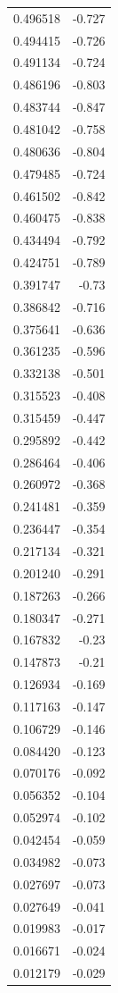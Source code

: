 \documentclass[number, sort&compress, review, 12pt]{elsarticle}
\begin{document}
\begin{longtable}{rr}
0.496518 & -0.727\\
0.494415 & -0.726\\
0.491134 & -0.724\\
0.486196 & -0.803\\
0.483744 & -0.847\\
0.481042 & -0.758\\
0.480636 & -0.804\\
0.479485 & -0.724\\
0.461502 & -0.842\\
0.460475 & -0.838\\
0.434494 & -0.792\\
0.424751 & -0.789\\
0.391747 & -0.73\\
0.386842 & -0.716\\
0.375641 & -0.636\\
0.361235 & -0.596\\
0.332138 & -0.501\\
0.315523 & -0.408\\
0.315459 & -0.447\\
0.295892 & -0.442\\
0.286464 & -0.406\\
0.260972 & -0.368\\
0.241481 & -0.359\\
0.236447 & -0.354\\
0.217134 & -0.321\\
0.201240 & -0.291\\
0.187263 & -0.266\\
0.180347 & -0.271\\
0.167832 & -0.23\\
0.147873 & -0.21\\
0.126934 & -0.169\\
0.117163 & -0.147\\
0.106729 & -0.146\\
0.084420 & -0.123\\
0.070176 & -0.092\\
0.056352 & -0.104\\
0.052974 & -0.102\\
0.042454 & -0.059\\
0.034982 & -0.073\\
0.027697 & -0.073\\
0.027649 & -0.041\\
0.019983 & -0.017\\
0.016671 & -0.024\\
0.012179 & -0.029\\

\end{longtable}
\end{document}
